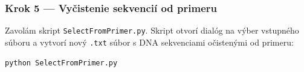 \subsubsection*{Krok 5 — Vyčistenie sekvencií od primeru}
Zavolám skript \texttt{SelectFromPrimer.py}. Skript otvorí dialóg na výber vstupného súboru a vytvorí nový \texttt{.txt} súbor s DNA sekvenciami očistenými od primeru:
\begin{verbatim}
python SelectFromPrimer.py
\end{verbatim}

